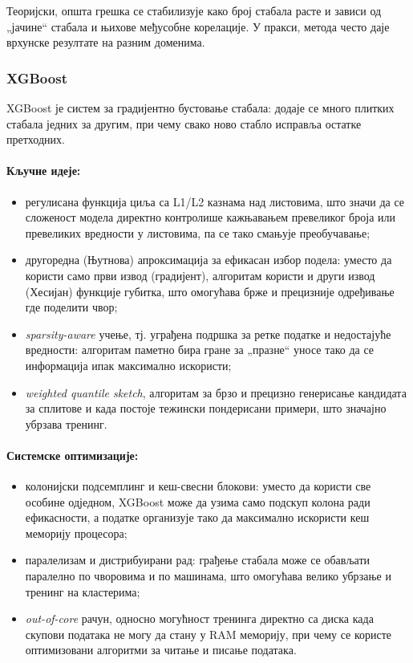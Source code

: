 Теоријски, општа грешка се стабилизује како број стабала расте и зависи од „јачине“ стабала и њихове међусобне корелације. У пракси, метода често даје врхунске резултате на разним доменима. \cite{breiman2001random}

\subsubsection{XGBoost}

XGBoost је систем за градијентно бустовање стабала: додаје се много плитких стабала једних за другим, при чему свако ново стабло исправља остатке претходних.

\paragraph{Кључне идеје:}
\begin{itemize}
  \item регулисана функција циља са L1/L2 казнама над листовима, што значи да се сложеност модела директно контролише кажњавањем превеликог броја или превеликих вредности у листовима, па се тако смањује преобучавање;
  \item другоредна (Њутнова) апроксимација за ефикасан избор подела: уместо да користи само први извод (градијент), алгоритам користи и други извод (Хесијан) функције губитка, што омогућава брже и прецизније одређивање где поделити чвор;
  \item \textit{sparsity-aware} учење, тј. уграђена подршка за ретке податке и недостајуће вредности: алгоритам паметно бира гране за „празне“ уносе тако да се информација ипак максимално искористи;
  \item \textit{weighted quantile sketch}, алгоритам за брзо и прецизно генерисање кандидата за сплитове и када постоје тежински пондерисани примери, што значајно убрзава тренинг.
\end{itemize}

\paragraph{Системске оптимизације:}
\begin{itemize}
  \item колонијски подсемплинг и кеш-свесни блокови: уместо да користи све особине одједном, XGBoost може да узима само подскуп колона ради ефикасности, а податке организује тако да максимално искористи кеш меморију процесора;
  \item паралелизам и дистрибуирани рад: грађење стабала може се обављати паралелно по чворовима и по машинама, што омогућава велико убрзање и тренинг на кластерима;
  \item \textit{out-of-core} рачун, односно могућност тренинга директно са диска када скупови података не могу да стану у RAM меморију, при чему се користе оптимизовани алгоритми за читање и писање података.
\end{itemize}

